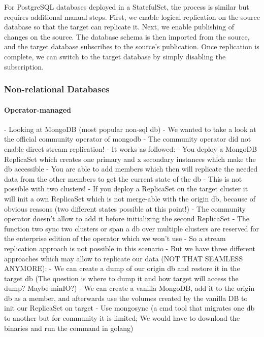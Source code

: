 For PostgreSQL databases deployed in a StatefulSet, the process is similar but requires additional manual steps. First, we enable logical replication on the source database so that the target can replicate it. Next, we enable publishing of changes on the source. The database schema is then imported from the source, and the target database subscribes to the source's publication. Once replication is complete, we can switch to the target database by simply disabling the subscription.
%
\subsubsection{Non-relational Databases}
%
%
\paragraph{Operator-managed}
%
- Looking at MongoDB (most popular non-sql db)
- We wanted to take a look at the official community operator of mongodb
- The community operator did not enable direct stream replication!
- It works as followed:
- You deploy a MongoDB ReplicaSet which creates one primary and x secondary instances which make the db accessible
- You are able to add members which then will replicate the needed data from the other members to get the current state of the db
- This is not possible with two clusters!
- If you deploy a ReplicaSet on the target cluster it will init a own ReplicaSet which is not merge-able with the origin db, because of obvious reasons (two different states possible at this point!)
- The community operator doesn't allow to add it before initializing the second ReplicaSet
- The function two sync two clusters or span a db over multiple clusters are reserved for the enterprise edition of the operator which we won't use
- So a stream replication approach is not possible in this scenario
- But we have three different approaches which may allow to replicate our data (NOT THAT SEAMLESS ANYMORE):
- We can create a dump of our origin db and restore it in the target db (The question is where to dump it and how target will access the dump? Maybe minIO?)
- We can create a vanilla MongoDB, add it to the origin db as a member, and afterwards use the volumes created by the vanilla DB to init our ReplicaSet on target
- Use mongosync (a cmd tool that migrates one db to another but for community it is limited; We would have to download the binaries and run the command in golang)
%
